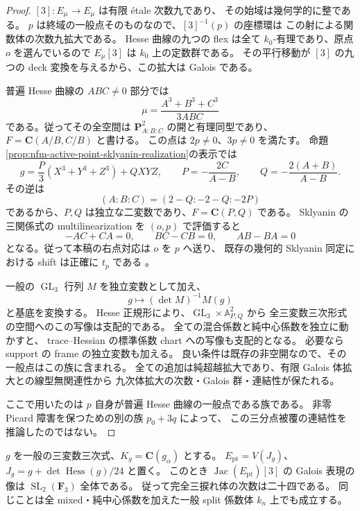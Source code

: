 \begin{proof}
$[3]:E_\mu\to E_\mu$ は有限 \'etale 次数九であり、
その始域は幾何学的に整である。
$p$ は終域の一般点そのものなので、$[3]^{-1}(p)$ の座標環は
この射による関数体の次数九拡大である。
Hesse 曲線の九つの flex は全て $k_0$-有理であり、原点 $o$ を選んでいるので
$E_\mu[3]$ は $k_0$ 上の定数群である。
その平行移動が $[3]$ の九つの deck 変換を与えるから、この拡大は Galois である。

普遍 Hesse 曲線の $ABC\ne0$ 部分では
\[
 \mu=\frac{A^3+B^3+C^3}{3ABC}
\]
である。従ってその全空間は $\mathbf P^2_{A:B:C}$ の開と有理同型であり、
$F=\mathbf C(A/B,C/B)$ と書ける。
この点は $2p\ne0$、$3p\ne0$ を満たす。
命題\ref{prop:nfm-active-point-sklyanin-realization}の表示では
\[
 g=\frac P3(X^3+Y^3+Z^3)+QXYZ,
 \qquad P=-\frac{2C}{A-B},\qquad
 Q=-\frac{2(A+B)}{A-B}.
\]
その逆は
\[
 (A:B:C)=(2-Q:-2-Q:-2P)
\]
であるから、$P,Q$ は独立な二変数であり、$F=\mathbf C(P,Q)$ である。
Sklyanin の三関係式の multilinearization を $(o,p)$ で評価すると
\[
 -AC+CA=0,\qquad BC-CB=0,\qquad AB-BA=0
\]
となる。従って本稿の右点対応は $o$ を $p$ へ送り、
既存の幾何的 Sklyanin 同定における shift は正確に $t_p$ である
\cite[Section~2.4 and Section~4]{NFMMatsunoElliptic}。

一般の $\operatorname{GL}_3$ 行列 $M$ を独立変数として加え、
\[
 g\longmapsto (\det M)^{-1}M(g)
\]
と基底を変換する。
Hesse 正規形により、$\operatorname{GL}_3\times\mathbb A^2_{P,Q}$ から
全三変数三次形式の空間へのこの写像は支配的である。
全ての混合係数と純中心係数を独立に動かすと、
trace--Hessian の標準係数 chart への写像も支配的となる。
必要なら support の frame の独立変数も加える。
良い条件は既存の非空開なので、その一般点はこの族に含まれる。
全ての追加は純超越拡大であり、有限 Galois 体拡大との線型無関連性から
九次体拡大の次数・Galois 群・連結性が保たれる。

ここで用いたのは $p$ 自身が普遍 Hesse 曲線の一般点である族である。
非零 Picard 障害を保つための別の族 $p_0+3q$ によって、
この三分点被覆の連結性を推論したのではない。
\end{proof}

\begin{lemma}
\label{lem:nfm-generic-active-three-torsion-monodromy}
$g$ を一般の三変数三次式、$K_g=\mathbf C(g_\alpha)$ とする。
$E_{\mathrm{pt}}=V(J_g)$、$J_g=g+\det\operatorname{Hess}(g)/24$ と置く。
このとき $\operatorname{Jac}(E_{\mathrm{pt}})[3]$ の Galois 表現の像は
$\operatorname{SL}_2(\mathbf F_3)$ 全体である。
従って完全三捩れ体の次数は二十四である。
同じことは全 mixed・純中心係数を加えた一般 split 係数体 $k_n$ 上でも成立する。
\end{lemma}

